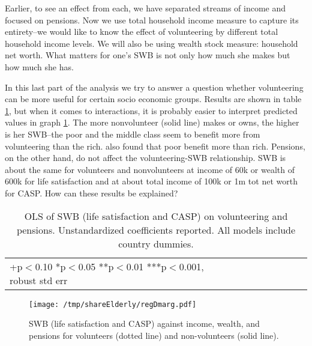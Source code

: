 \documentclass[10pt, letterpaper]{article}
\begin{document}
\begin{spacing}{1.4}
Earlier,  to see an effect from each, we have separated streams of income and focused on pensions. 
Now we use total household income measure to capture its entirety--we would
like to know the effect of volunteering by different total household income
levels. We will also be using wealth stock measure: household net worth.
%
What matters for one's SWB is not only how much she makes but how much she has.

In this last part of the analysis we try to answer a question whether
volunteering can be more useful for certain socio economic groups. %
  Results are shown in
table \ref{regDw6}, but when it comes to interactions, it is probably easier to
interpret predicted values in graph \ref{mar}.
The more nonvolunteer (solid line) makes or owns, the higher is her SWB--the poor and the middle
class seem to benefit more from volunteering than the rich. \citet{dulin2012volunteering} also found that poor benefit more than rich. Pensions, on the
other hand, do not affect the volunteering-SWB relationship.
%
SWB is about the same for volunteers and nonvolunteers at income of 60k or
wealth of 600k for life satisfaction and 
at about total income of 100k or 1m tot net worth for CASP.  
% 
How can these results be explained?

\begin{spacing}{.9}
\begin{table}[H]\centering \caption{OLS of SWB  (life satisfaction and CASP) on
    volunteering and pensions.  Unstandardized coefficients reported. All models
    include country dummies.}  \begin{scriptsize} \begin{tabular}{p{1.8in}p{.5in}p{.5in}p{.5in}p{.5in}|p{.5in}p{.5in}p{.5in}p{.5in}p{.5in}p{.4in}p{.5in}p{.4in}}\hline 
      \hline\multicolumn{5}{l}{+p$<$0.10 *p$<$0.05 **p$<$0.01 ***p$<$0.001,
        robust std err} \end{tabular}\label{regDw6} \end{scriptsize}\end{table}
\end{spacing}


\begin{figure}[h!]
  \centering
\texttt{[image: /tmp/shareElderly/regDmarg.pdf]}  
  \caption{SWB  (life satisfaction and CASP) against income, wealth, and
    pensions for volunteers (dotted line) and non-volunteers (solid line).}
  \label{mar}
\end{figure}



\end{spacing}
\end{document}
